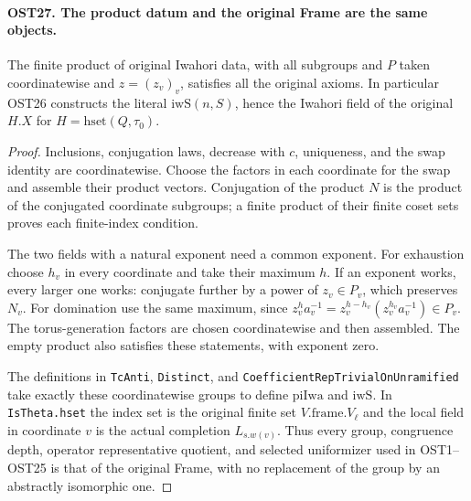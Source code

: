 \paragraph{OST27. The product datum and the original Frame are the same objects.}
\label{claim:OST27}
The finite product of original Iwahori data, with all subgroups
and $P$ taken coordinatewise and $z=(z_v)_v$, satisfies all
the original axioms.  In particular OST26 constructs the
literal $\mathrm{iwS}(n,S)$, hence the Iwahori field of the
original $H.X$ for $H=\mathrm{hset}(Q,\tau_0)$.
\begin{proof}
Inclusions, conjugation laws, decrease with $c$, uniqueness,
and the swap identity are coordinatewise.  Choose the factors
in each coordinate for the swap and assemble their product
vectors.  Conjugation of the product $N$ is the product of
the conjugated coordinate subgroups; a finite product of their
finite coset sets proves each finite-index condition.

The two fields with a natural exponent need a common exponent.
For exhaustion choose $h_v$ in every coordinate and take their
maximum $h$.  If an exponent works, every larger one works:
conjugate further by a power of $z_v\in P_v$, which preserves
$N_v$.  For domination use the same maximum, since
$z_v^h a_v^{-1}=z_v^{h-h_v}(z_v^{h_v}a_v^{-1})\in P_v$.
The torus-generation factors are chosen coordinatewise and
then assembled.  The empty product also satisfies these
statements, with exponent zero.

The definitions in \texttt{TcAnti}, \texttt{Distinct}, and
\texttt{CoefficientRepTrivialOnUnramified} take exactly these
coordinatewise groups to define $\mathrm{piIwa}$ and
$\mathrm{iwS}$.  In \texttt{IsTheta.hset} the index set is
the original finite set $V.\mathrm{frame}.V_\ell$ and the
local field in coordinate $v$ is the actual completion
$L_{s.w(v)}$.  Thus every group, congruence depth, operator
representative quotient, and selected uniformizer used in
OST1--OST25 is that of the original Frame, with no replacement
of the group by an abstractly isomorphic one.
\end{proof}

